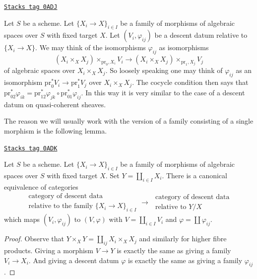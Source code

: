 \begin{remark}
\label{spaces-descent-remark-easier-family}
\href{https://stacks.math.columbia.edu/tag/0ADJ}{\texttt{Stacks tag 0ADJ}}

Let $S$ be a scheme.
Let $\{X_i \to X\}_{i \in I}$ be a family of morphisms
of algebraic spaces over $S$ with fixed target $X$.
Let $(V_i, \varphi_{ij})$ be a descent datum relative to
$\{X_i \to X\}$. We may think of the isomorphisms $\varphi_{ij}$
as isomorphisms
$$
(X_i \times_X X_j) \times_{\text{pr}_0, X_i} V_i
\longrightarrow
(X_i \times_X X_j) \times_{\text{pr}_1, X_j} V_j
$$
of algebraic spaces over $X_i \times_X X_j$. So loosely speaking one may
think of $\varphi_{ij}$ as an isomorphism
$\text{pr}_0^*V_i \to \text{pr}_1^*V_j$ over $X_i \times_X X_j$.
The cocycle condition then says that
$\text{pr}_{02}^*\varphi_{ik} =
\text{pr}_{12}^*\varphi_{jk} \circ \text{pr}_{01}^*\varphi_{ij}$.
In this way it is very similar to the case of a descent datum on
quasi-coherent sheaves.
\end{remark}

The reason we will usually work with the version of a family consisting
of a single morphism is the following lemma.

\begin{lemma}
\label{spaces-descent-lemma-family-is-one}
\href{https://stacks.math.columbia.edu/tag/0ADK}{\texttt{Stacks tag 0ADK}}

Let $S$ be a scheme.
Let $\{X_i \to X\}_{i \in I}$ be a family of morphisms
of algebraic spaces over $S$ with fixed target $X$.
Set $Y = \coprod_{i \in I} X_i$.
There is a canonical equivalence of categories
$$
\begin{matrix}
\text{category of descent data } \\
\text{relative to the family } \{X_i \to X\}_{i \in I}
\end{matrix}
\longrightarrow
\begin{matrix}
\text{ category of descent data} \\
\text{ relative to } Y/X
\end{matrix}
$$
which maps $(V_i, \varphi_{ij})$ to $(V, \varphi)$ with
$V = \coprod_{i\in I} V_i$ and $\varphi = \coprod \varphi_{ij}$.
\end{lemma}

\begin{proof}
Observe that $Y \times_X Y = \coprod_{ij} X_i \times_X X_j$
and similarly for higher fibre products.
Giving a morphism $V \to Y$ is exactly the same as
giving a family $V_i \to X_i$. And giving a descent datum
$\varphi$ is exactly the same as giving a family $\varphi_{ij}$.
\end{proof}

